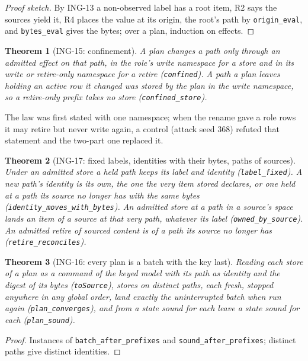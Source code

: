 \documentclass[11pt]{article}
\theoremstyle{plain}
\newtheorem{theorem}{Theorem}[section]
\theoremstyle{definition}
\theoremstyle{remark}
\newcommand{\lean}[1]{\texttt{#1}}
\newcommand{\ing}[1]{ING-#1}
\begin{document}
\begin{proof}[Proof sketch]
By \ing{13} a non-observed label has a root item, R2 says the sources yield it, R4 places the
value at its origin, the root's path by \lean{origin\_eval}, and \lean{bytes\_eval} gives the
bytes; over a plan, induction on effects.
\end{proof}

\begin{theorem}[\ing{15}: confinement]
A plan changes a path only through an admitted effect on that path, in the role's write
namespace for a store and in its write or retire-only namespace for a retire
(\lean{confined}). A path a plan leaves holding an active row it changed was stored by the plan
in the write namespace, so a retire-only prefix takes no store (\lean{confined\_store}).
\end{theorem}

The law was first stated with one namespace; when the rename gave a role rows it may retire but
never write again, a control (attack seed 368) refuted that statement and the two-part one
replaced it.

\begin{theorem}[\ing{17}: fixed labels, identities with their bytes, paths of sources]
Under an admitted store a held path keeps its label and identity (\lean{label\_fixed}). A new
path's identity is its own, the one the very item stored declares, or one held at a path its
source no longer has with the same bytes (\lean{identity\_moves\_with\_bytes}). An admitted
store at a path in a source's space lands an item of a source at that very path, whatever its
label (\lean{owned\_by\_source}). An admitted retire of sourced content is of a path its source
no longer has (\lean{retire\_reconciles}).
\end{theorem}

\begin{theorem}[\ing{16}: every plan is a batch with the key last]
Reading each store of a plan as a command of the keyed model with its path as identity and the
digest of its bytes (\lean{toSource}), stores on distinct paths, each fresh, stopped anywhere
in any global order, land exactly the uninterrupted batch when run again
(\lean{plan\_converges}), and from a state sound for each leave a state sound for each
(\lean{plan\_sound}).
\end{theorem}

\begin{proof}
Instances of \lean{batch\_after\_prefixes} and \lean{sound\_after\_prefixes}; distinct paths
give distinct identities.
\end{proof}
\end{document}
